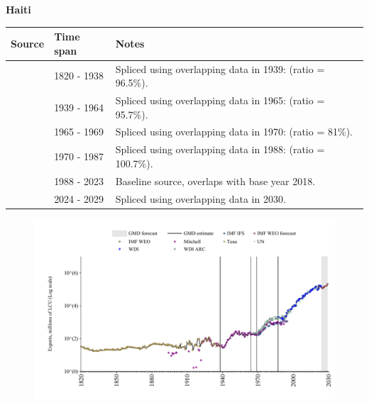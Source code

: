 \documentclass[12pt,a4paper,landscape]{article}
\begin{document}
\begin{adjustbox}{max totalsize={\paperwidth}{\paperheight},center}
\begin{minipage}[t][\textheight][t]{\textwidth}
\vspace*{0.5cm}
{}
\begin{center}
{\Large\bfseries Haiti}
\end{center}
\vspace{0.5cm}
\begin{table}[H]
\centering
\small
\begin{tabular}{|l|l|l|}
\hline
\textbf{Source} & \textbf{Time span} & \textbf{Notes} \\
\hline
\rowcolor{white}\cite{Tena}& 1820 - 1938 &Spliced using overlapping data in 1939: (ratio = 96.5\%).\\
\rowcolor{lightgray}\cite{Mitchell}& 1939 - 1964 &Spliced using overlapping data in 1965: (ratio = 95.7\%).\\
\rowcolor{white}\cite{WDI_ARC}& 1965 - 1969 &Spliced using overlapping data in 1970: (ratio = 81\%).\\
\rowcolor{lightgray}\cite{UN}& 1970 - 1987 &Spliced using overlapping data in 1988: (ratio = 100.7\%).\\
\rowcolor{white}\cite{WDI}& 1988 - 2023 &Baseline source, overlaps with base year 2018.\\
\rowcolor{lightgray}\cite{IMF_WEO_forecast}& 2024 - 2029 &Spliced using overlapping data in 2030.\\
\hline
\end{tabular}
\end{table}
\begin{figure}[H]
\centering
\includegraphics[width=\textwidth,height=0.6\textheight,keepaspectratio]{graphs/HTI_exports.pdf}
\end{figure}
\end{minipage}
\end{adjustbox}
\end{document}
